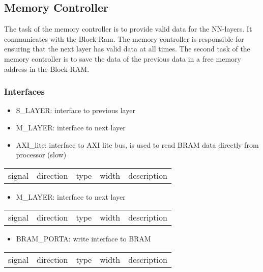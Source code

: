 \subsection{Memory Controller}
The task of the memory controller is to provide valid data for the NN-layers. It communicates with the Block-Ram. The memory controller is responsible for ensuring that the next layer has valid data at all times. The second task of the memory controller is to save the data of the previous data in a free memory address in the Block-RAM. 

\subsubsection{Interfaces}
\begin{itemize}
	\item S\_LAYER: interface to previous layer
	\item M\_LAYER: interface to next layer 
	\item AXI_lite: interface to AXI lite bus, is used to read BRAM data directly from processor (slow)
\end{itemize}
\begin{tabular}{|l|l|l|l|l|}
	
	signal & direction & type & width & description\\
	
\end{tabular}

\begin{itemize}
	\item M\_LAYER: interface to next layer
\end{itemize}
\begin{tabular}{|l|l|l|l|l|}
	
	signal & direction & type & width & description\\
	
\end{tabular}

\begin{itemize}
	\item BRAM\_PORTA: write interface to BRAM
\end{itemize}
\begin{tabular}{|l|l|l|l|l|}
	
	signal & direction & type & width & description\\
	
\end{tabular}

